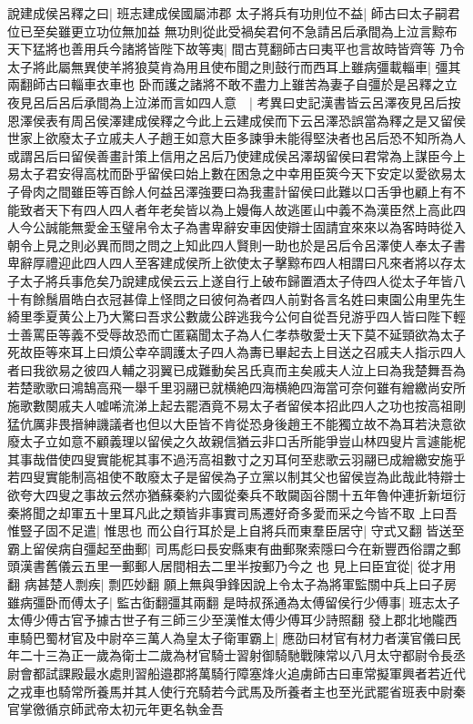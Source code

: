 說建成侯呂釋之曰|{
	班志建成侯國屬沛郡}
太子將兵有功則位不益|{
	師古曰太子嗣君位已至矣雖更立功位無加益}
無功則從此受禍矣君何不急請呂后承間為上泣言黥布天下猛將也善用兵今諸將皆陛下故等夷|{
	間古莧翻師古曰夷平也言故時皆齊等}
乃令太子將此屬無異使羊將狼莫肯為用且使布聞之則鼓行而西耳上雖病彊載輜車|{
	彊其兩翻師古曰輜車衣車也}
卧而護之諸將不敢不盡力上雖苦為妻子自彊於是呂釋之立夜見呂后呂后承間為上泣涕而言如四人意　|{
	考異曰史記漢書皆云呂澤夜見呂后按恩澤侯表有周呂侯澤建成侯釋之今此上云建成侯而下云呂澤恐誤當為釋之是又留侯世家上欲廢太子立戚夫人子趙王如意大臣多諫爭未能得堅決者也呂后恐不知所為人或謂呂后曰留侯善畫計策上信用之呂后乃使建成侯呂澤刼留侯曰君常為上謀臣今上易太子君安得高枕而卧乎留侯曰始上數在困急之中幸用臣筴今天下安定以愛欲易太子骨肉之間雖臣等百餘人何益呂澤強要曰為我畫計留侯曰此難以口舌爭也顧上有不能致者天下有四人四人者年老矣皆以為上嫚侮人故逃匿山中義不為漢臣然上高此四人今公誠能無愛金玉璧帛令太子為書卑辭安車因使辯士固請宜來來以為客時時從入朝令上見之則必異而問之問之上知此四人賢則一助也於是呂后令呂澤使人奉太子書卑辭厚禮迎此四人四人至客建成侯所上欲使太子擊黥布四人相謂曰凡來者將以存太子太子將兵事危矣乃說建成侯云云上遂自行上破布歸置酒太子侍四人從太子年皆八十有餘鬚眉皓白衣冠甚偉上怪問之曰彼何為者四人前對各言名姓曰東園公甪里先生綺里季夏黄公上乃大驚曰吾求公數歲公辟逃我今公何自從吾兒游乎四人皆曰陛下輕士善罵臣等義不受辱故恐而亡匿竊聞太子為人仁孝恭敬愛士天下莫不延頸欲為太子死故臣等來耳上曰煩公幸卒調護太子四人為夀已畢起去上目送之召戚夫人指示四人者曰我欲易之彼四人輔之羽翼已成難動矣呂氏真而主矣戚夫人泣上曰為我楚舞吾為若楚歌歌曰鴻鵠高飛一舉千里羽翮已就横絶四海横絶四海當可奈何雖有繒繳尚安所施歌數闋戚夫人嘘唏流涕上起去罷酒竟不易太子者留侯本招此四人之功也按高祖剛猛伉厲非畏搢紳譏議者也但以大臣皆不肯從恐身後趙王不能獨立故不為耳若決意欲廢太子立如意不顧義理以留侯之久故親信猶云非口舌所能爭豈山林四叟片言遽能柅其事哉借使四叟實能柅其事不過汚高祖數寸之刃耳何至悲歌云羽翮已成繒繳安施乎若四叟實能制高祖使不敢廢太子是留侯為子立黨以制其父也留侯豈為此哉此特辯士欲夸大四叟之事故云然亦猶蘇秦約六國從秦兵不敢闚函谷關十五年魯仲連折新垣衍秦將聞之却軍五十里耳凡此之類皆非事實司馬遷好奇多愛而采之今皆不取}
上曰吾惟豎子固不足遣|{
	惟思也}
而公自行耳於是上自將兵而東羣臣居守|{
	守式又翻}
皆送至霸上留侯病自彊起至曲郵|{
	司馬彪曰長安縣東有曲郵聚索隱曰今在新豐西俗謂之郵頭漢書舊儀云五里一郵郵人居間相去二里半按郵乃今之也}
見上曰臣宜從|{
	從才用翻}
病甚楚人剽疾|{
	剽匹妙翻}
願上無與爭鋒因說上令太子為將軍監關中兵上曰子房雖病彊卧而傅太子|{
	監古衘翻彊其兩翻}
是時叔孫通為太傅留侯行少傅事|{
	班志太子太傅少傅古官予據古世子有三師三少至漢惟太傅少傅耳少詩照翻}
發上郡北地隴西車騎巴蜀材官及中尉卒三萬人為皇太子衛軍霸上|{
	應劭曰材官有材力者漢官儀曰民年二十三為正一歲為衛士二歲為材官騎士習射御騎馳戰陳常以八月太守都尉令長丞尉會都試課殿最水處則習船邉郡將萬騎行障塞烽火追虜師古曰車常擬軍興者若近代之戎車也騎常所養馬并其人使行充騎若今武馬及所養者主也至光武罷省班表中尉秦官掌徼循京師武帝太初元年更名執金吾}
